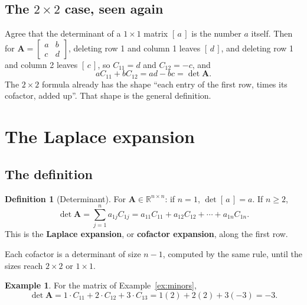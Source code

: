 \documentclass[11pt]{article}
\theoremstyle{plain}
\theoremstyle{definition}
\newtheorem{defn}{Definition}[section]
\newtheorem{ex}{Example}[section]
\theoremstyle{remark}
\newcommand{\R}{\mathbb{R}}
\newcommand{\mt}[1]{\mathbf{#1}}
\begin{document}
\subsection{The \texorpdfstring{$2\times2$}{2x2} case, seen again}
Agree that the determinant of a $1\times1$ matrix $[\,a\,]$ is the number $a$
itself. Then for $\mt{A}=\begin{bmatrix}a&b\\c&d\end{bmatrix}$, deleting row 1 and
column 1 leaves $[\,d\,]$, and deleting row 1 and column 2 leaves $[\,c\,]$, so
$C_{11}=d$ and $C_{12}=-c$, and
\[
  aC_{11}+bC_{12}=ad-bc=\det\mt{A}.
\]
The $2\times2$ formula already has the shape ``each entry of the first row,
times its cofactor, added up''. That shape is the general definition.

\section{The Laplace expansion}

\subsection{The definition}
\begin{defn}[Determinant]
For $\mt{A}\in\R^{n\times n}$: if $n=1$, $\det[\,a\,]=a$. If $n\ge2$,
\[
  \boxed{\;\det\mt{A}=\sum_{j=1}^{n}a_{1j}C_{1j}
  =a_{11}C_{11}+a_{12}C_{12}+\cdots+a_{1n}C_{1n}.\;}
\]
This is the \textbf{Laplace expansion}, or \textbf{cofactor expansion}, along the
first row.
\end{defn}

\noindent Each cofactor is a determinant of size $n-1$, computed by the same rule,
until the sizes reach $2\times2$ or $1\times1$.

\begin{ex}
For the matrix of Example~\ref{ex:minors},
\[
  \det\mt{A}=1\cdot C_{11}+2\cdot C_{12}+3\cdot C_{13}=1(2)+2(2)+3(-3)=-3 .
\]
\end{ex}

\end{document}
